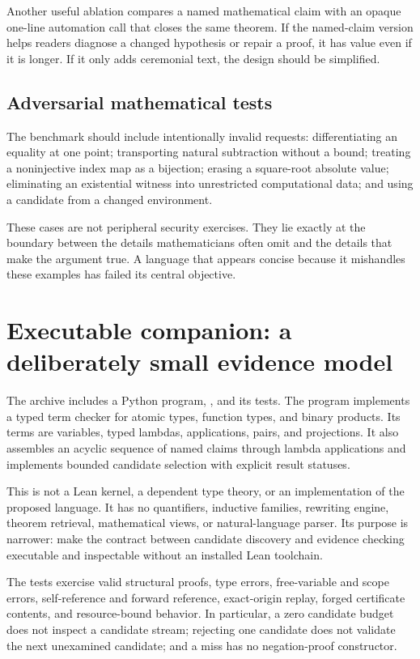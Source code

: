 \documentclass[11pt,a4paper]{article}
\newcommand{\code}[1]{\texttt{\detokenize{#1}}}
\theoremstyle{remark}
\begin{document}
Another useful ablation compares a named mathematical claim with an opaque one-line automation call that closes the same theorem. If the named-claim version helps readers diagnose a changed hypothesis or repair a proof, it has value even if it is longer. If it only adds ceremonial text, the design should be simplified.

\subsection{Adversarial mathematical tests}

The benchmark should include intentionally invalid requests: differentiating an equality at one point; transporting natural subtraction without a bound; treating a noninjective index map as a bijection; erasing a square-root absolute value; eliminating an existential witness into unrestricted computational data; and using a candidate from a changed environment.

These cases are not peripheral security exercises. They lie exactly at the boundary between the details mathematicians often omit and the details that make the argument true. A language that appears concise because it mishandles these examples has failed its central objective.

\section{Executable companion: a deliberately small evidence model}\label{sec:toy}

The archive includes a Python program, \code{supplement/toy_checker.py}, and its tests. The program implements a typed term checker for atomic types, function types, and binary products. Its terms are variables, typed lambdas, applications, pairs, and projections. It also assembles an acyclic sequence of named claims through lambda applications and implements bounded candidate selection with explicit result statuses.

This is not a Lean kernel, a dependent type theory, or an implementation of the proposed language. It has no quantifiers, inductive families, rewriting engine, theorem retrieval, mathematical views, or natural-language parser. Its purpose is narrower: make the contract between candidate discovery and evidence checking executable and inspectable without an installed Lean toolchain.

The tests exercise valid structural proofs, type errors, free-variable and scope errors, self-reference and forward reference, exact-origin replay, forged certificate contents, and resource-bound behavior. In particular, a zero candidate budget does not inspect a candidate stream; rejecting one candidate does not validate the next unexamined candidate; and a miss has no negation-proof constructor.
\end{document}
